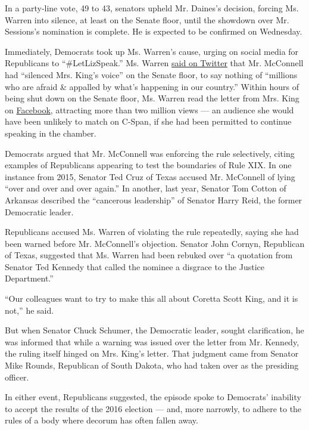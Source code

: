 In a party-line vote, 49 to 43, senators upheld Mr. Daines's decision,
forcing Ms. Warren into silence, at least on the Senate floor, until the
showdown over Mr. Sessions's nomination is complete. He is expected to
be confirmed on Wednesday.

Immediately, Democrats took up Ms. Warren's cause, urging on social
media for Republicans to ``\#LetLizSpeak.'' Ms. Warren
\href{https://twitter.com/SenWarren/status/829140554109820928}{said on
Twitter} that Mr. McConnell had ``silenced Mrs. King's voice'' on the
Senate floor, to say nothing of ``millions who are afraid \& appalled by
what's happening in our country.'' Within hours of being shut down on
the Senate floor, Ms. Warren read the letter from Mrs. King on
\href{https://www.facebook.com/senatorelizabethwarren/videos/vb.131559043673264/724337794395383/?type=2\&theater\&notif_t=live_video_interaction\&notif_id=1486526408091711}{Facebook},
attracting more than two million views --- an audience she would have
been unlikely to match on C-Span, if she had been permitted to continue
speaking in the chamber.

Democrats argued that Mr. McConnell was enforcing the rule selectively,
citing examples of Republicans appearing to test the boundaries of Rule
XIX. In one instance from 2015, Senator Ted Cruz of Texas accused Mr.
McConnell of lying ``over and over and over again.'' In another, last
year, Senator Tom Cotton of Arkansas described the ``cancerous
leadership'' of Senator Harry Reid, the former Democratic leader.

Republicans accused Ms. Warren of violating the rule repeatedly, saying
she had been warned before Mr. McConnell's objection. Senator John
Cornyn, Republican of Texas, suggested that Ms. Warren had been rebuked
over ``a quotation from Senator Ted Kennedy that called the nominee a
disgrace to the Justice Department.''

``Our colleagues want to try to make this all about Coretta Scott King,
and it is not,'' he said.

But when Senator Chuck Schumer, the Democratic leader, sought
clarification, he was informed that while a warning was issued over the
letter from Mr. Kennedy, the ruling itself hinged on Mrs. King's letter.
That judgment came from Senator Mike Rounds, Republican of South Dakota,
who had taken over as the presiding officer.

In either event, Republicans suggested, the episode spoke to Democrats'
inability to accept the results of the 2016 election --- and, more
narrowly, to adhere to the rules of a body where decorum has often
fallen away.


